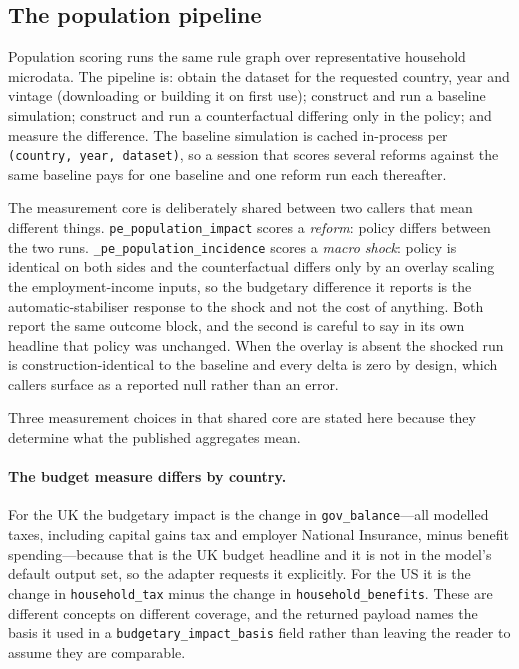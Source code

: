 \subsection{The population pipeline}
\label{sec:poppipeline}

Population scoring runs the same rule graph over representative household microdata. The pipeline is: obtain the dataset for the requested country, year and vintage (downloading or building it on first use); construct and run a baseline simulation; construct and run a counterfactual differing only in the policy; and measure the difference. The baseline simulation is cached in-process per \texttt{(country, year, dataset)}, so a session that scores several reforms against the same baseline pays for one baseline and one reform run each thereafter.

The measurement core is deliberately shared between two callers that mean different things. \texttt{pe\_population\_impact} scores a \emph{reform}: policy differs between the two runs. \texttt{\_pe\_population\_incidence} scores a \emph{macro shock}: policy is identical on both sides and the counterfactual differs only by an overlay scaling the employment-income inputs, so the budgetary difference it reports is the automatic-stabiliser response to the shock and not the cost of anything. Both report the same outcome block, and the second is careful to say in its own headline that policy was unchanged. When the overlay is absent the shocked run is construction-identical to the baseline and every delta is zero by design, which callers surface as a reported null rather than an error.

Three measurement choices in that shared core are stated here because they determine what the published aggregates mean.

\paragraph{The budget measure differs by country.} For the UK the budgetary impact is the change in \texttt{gov\_balance}---all modelled taxes, including capital gains tax and employer National Insurance, minus benefit spending---because that is the UK budget headline and it is not in the model's default output set, so the adapter requests it explicitly. For the US it is the change in \texttt{household\_tax} minus the change in \texttt{household\_benefits}. These are different concepts on different coverage, and the returned payload names the basis it used in a \texttt{budgetary\_impact\_basis} field rather than leaving the reader to assume they are comparable.

